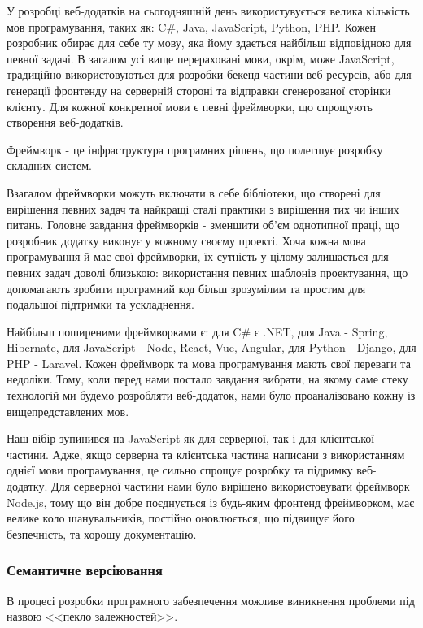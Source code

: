 У розробці веб-додатків на сьогодняшній день використувується велика кількість мов програмування, таких як: C\#, Java, JavaScript, Python, PHP. Кожен розробник обирає для себе ту мову, яка йому здається найбільш відповідною для певної задачі. В загалом усі вище перераховані мови, окрім, може JavaScript, традиційно використовуються для розробки бекенд-частини веб-ресурсів, або для генерації фронтенду на серверній стороні та відправки сгенерованої сторінки клієнту. Для кожної конкретної мови є певні фреймворки, що спрощують створення веб-додатків.

Фреймворк - це інфраструктура програмних рішень, що полегшує розробку складних систем.

Взагалом фреймворки можуть включати в себе бібліотеки, що створені для вирішення певних задач та найкращі сталі практики з вирішення тих чи інших питань. Головне завдання фреймворків - зменшити об'єм однотипної праці, що розробник додатку виконує у кожному своєму проекті. Хоча кожна мова програмування й має свої фреймворки, їх сутність у цілому залишається для певних задач доволі близькою: використання певних шаблонів проектування, що допомагають зробити програмний код більш зрозумілим та простим для подальшої підтримки та ускладнення.

Найбільш поширеними фреймворками є: для C\# є .NET, для Java - Spring, Hibernate, для JavaScript - Node, React, Vue, Angular, для Python - Django, для PHP - Laravel. Кожен фреймворк та мова програмування мають свої переваги та недоліки. Тому, коли перед нами постало завдання вибрати, на якому саме стеку технологій ми будемо розробляти веб-додаток, нами було проаналізовано кожну із вищепредставлених мов.

Наш вібір зупинився на JavaScript як для серверної, так і для клієнтської частини. Адже, якщо серверна та клієнтська частина написани з використанням однієї мови програмування, це сильно спрощує розробку та підримку веб-додатку. Для серверної частини нами було вирішено використовувати фреймворк Node.js, тому що він добре поєднується із будь-яким фронтенд фреймворком, має велике коло шанувальників, постійно оновлюється, що підвищує його безпечність, та хорошу документацію.  

\subsubsection{Семантичне версіювання}

В процесі розробки програмного забезпечення можливе виникнення проблеми під назвою <<пекло залежностей>>. 

